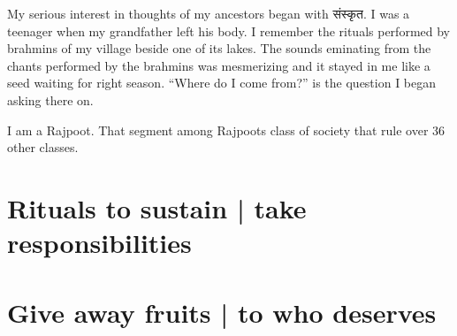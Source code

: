 \documentclass[oneside,11pt]{memoir} %
\begin{document}
My serious interest in thoughts of my ancestors began with संस्कृत. I was a teenager when my grandfather left his body. I remember the rituals performed by brahmins of my village beside one of its lakes. The sounds eminating from the chants performed by the brahmins was mesmerizing and it stayed in me like a seed waiting for right season. ``Where do I come from?'' is the question I began asking there on.

I am a Rajpoot. That segment among Rajpoots class of society that rule over 36 other classes.


\chapter{Rituals to sustain | take responsibilities}



\chapter{Give away fruits | to who deserves}



\end{document}
